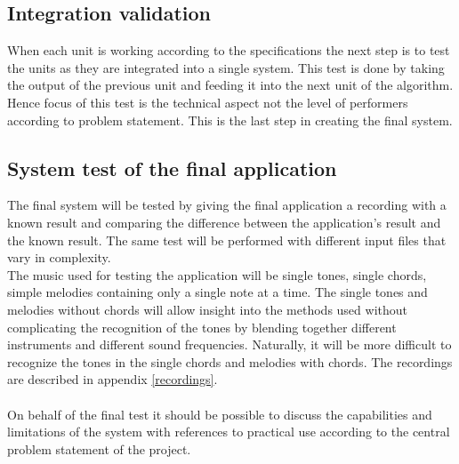 \subsection{Integration validation}
When each unit is working according to the specifications the next step is to test the units as they are integrated into a single system. This test is done by taking the output of the previous unit and feeding it into the next unit of the algorithm. Hence focus of this test is the technical aspect not the level of performers according to problem statement. This is the last step in creating the final system.

\subsection{System test of the final application}
The final system will be tested by giving the final application a recording with a known result and comparing the difference between the application's result and the known result. The same test will be performed with different input files that vary in complexity.
\\
The music used for testing the application will be single tones, single chords, simple melodies containing only a single note at a time. The single tones and melodies without chords will allow insight into the methods used without complicating the recognition of the tones by blending together different instruments and different sound frequencies. Naturally, it will be more difficult to recognize the tones in the single chords and melodies with chords. The recordings are described in appendix \ref{recordings}. \\
\\
On behalf of the final test it should be possible to discuss the capabilities and limitations of the system with references to practical use according to the central problem statement of the project.  